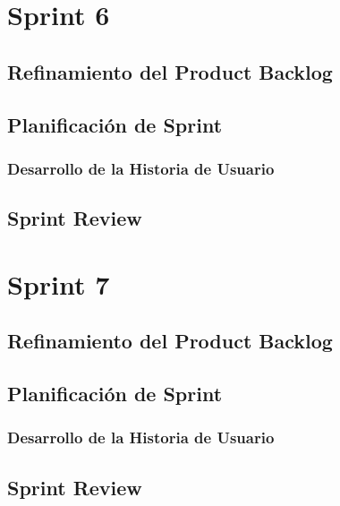 \section{Sprint 6}
	\subsection{Refinamiento del Product Backlog}
	
	\subsection{Planificación de Sprint}
	
	\subsubsection{Desarrollo de la Historia de Usuario }
			
	\subsection{Sprint Review}

\section{Sprint 7}
	\subsection{Refinamiento del Product Backlog}
	
	\subsection{Planificación de Sprint}
	
	\subsubsection{Desarrollo de la Historia de Usuario }
			
	\subsection{Sprint Review}

